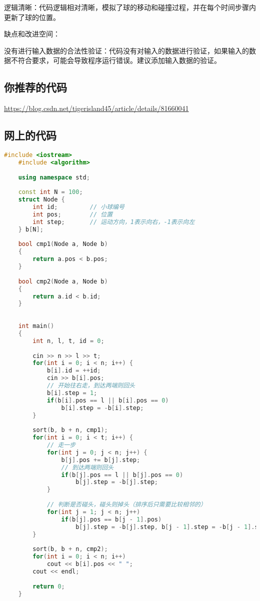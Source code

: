 逻辑清晰：代码逻辑相对清晰，模拟了球的移动和碰撞过程，并在每个时间步骤内更新了球的位置。

缺点和改进空间：

没有进行输入数据的合法性验证：代码没有对输入的数据进行验证，如果输入的数据不符合要求，可能会导致程序运行错误。建议添加输入数据的验证。

\subsection{你推荐的代码}

\href{201803-2 碰撞的小球}{https://blog.csdn.net/tigerisland45/article/details/81660041}

\subsection{网上的代码}
\begin{lstlisting}[language=C++]
    #include <iostream>
    #include <algorithm>
     
    using namespace std;
     
    const int N = 100;
    struct Node {
        int id;         // 小球编号
        int pos;        // 位置
        int step;       // 运动方向，1表示向右，-1表示向左
    } b[N];
     
    bool cmp1(Node a, Node b)
    {
        return a.pos < b.pos;
    }
     
    bool cmp2(Node a, Node b)
    {
        return a.id < b.id;
    }
     
     
    int main()
    {
        int n, l, t, id = 0;
     
        cin >> n >> l >> t;
        for(int i = 0; i < n; i++) {
            b[i].id = ++id;
            cin >> b[i].pos;
            // 开始往右走，到达两端则回头
            b[i].step = 1;
            if(b[i].pos == l || b[i].pos == 0)
                b[i].step = -b[i].step;
        }
     
        sort(b, b + n, cmp1);
        for(int i = 0; i < t; i++) {
            // 走一步
            for(int j = 0; j < n; j++) {
                b[j].pos += b[j].step;
                // 到达两端则回头
                if(b[j].pos == l || b[j].pos == 0)
                    b[j].step = -b[j].step;
            }
     
            // 判断是否碰头，碰头则掉头（排序后只需要比较相邻的）
            for(int j = 1; j < n; j++)
                if(b[j].pos == b[j - 1].pos)
                    b[j].step = -b[j].step, b[j - 1].step = -b[j - 1].step;
        }
     
        sort(b, b + n, cmp2);
        for(int i = 0; i < n; i++)
            cout << b[i].pos << " ";
        cout << endl;
     
        return 0;
    }    
\end{lstlisting}